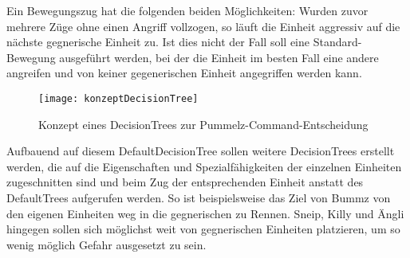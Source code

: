 Ein Bewegungszug hat die folgenden beiden Möglichkeiten: Wurden zuvor mehrere Züge ohne einen Angriff vollzogen, so läuft die Einheit aggressiv auf die nächste gegnerische Einheit zu. Ist dies nicht der Fall soll eine Standard-Bewegung ausgeführt werden, bei der die Einheit im besten Fall eine andere angreifen und von keiner gegenerischen Einheit angegriffen werden kann.

\begin{figure}[H]
	\centering
	\texttt{[image: konzeptDecisionTree]}
	\caption{Konzept eines DecisionTrees zur Pummelz-Command-Entscheidung}
	\label{fig:konzeptDecisionTree}
\end{figure}

Aufbauend auf diesem DefaultDecisionTree sollen weitere DecisionTrees erstellt werden, die auf die Eigenschaften und Spezialfähigkeiten der einzelnen Einheiten zugeschnitten sind und beim Zug der entsprechenden Einheit anstatt des DefaultTrees aufgerufen werden. So ist beispielsweise das Ziel von Bummz von den eigenen Einheiten weg in die gegnerischen zu Rennen. Sneip, Killy und Ängli hingegen sollen sich möglichst weit von gegnerischen Einheiten platzieren, um so wenig möglich Gefahr ausgesetzt zu sein.